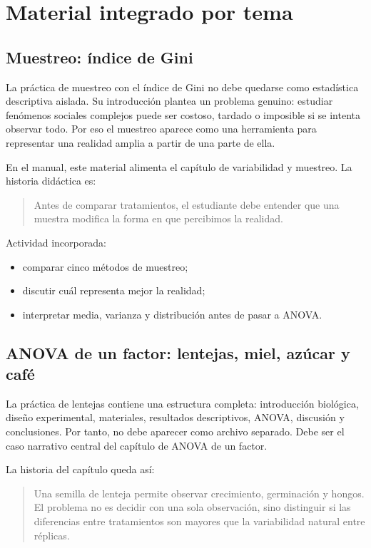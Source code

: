 \section{Material integrado por tema}

\subsection{Muestreo: índice de Gini}

La práctica de muestreo con el índice de Gini no debe quedarse como estadística descriptiva aislada. Su introducción plantea un problema genuino: estudiar fenómenos sociales complejos puede ser costoso, tardado o imposible si se intenta observar todo. Por eso el muestreo aparece como una herramienta para representar una realidad amplia a partir de una parte de ella.

En el manual, este material alimenta el capítulo de variabilidad y muestreo. La historia didáctica es:

\begin{quote}
Antes de comparar tratamientos, el estudiante debe entender que una muestra modifica la forma en que percibimos la realidad.
\end{quote}

Actividad incorporada:

\begin{itemize}
  \item comparar cinco métodos de muestreo;
  \item discutir cuál representa mejor la realidad;
  \item interpretar media, varianza y distribución antes de pasar a ANOVA.
\end{itemize}

\subsection{ANOVA de un factor: lentejas, miel, azúcar y café}

La práctica de lentejas contiene una estructura completa: introducción biológica, diseño experimental, materiales, resultados descriptivos, ANOVA, discusión y conclusiones. Por tanto, no debe aparecer como archivo separado. Debe ser el caso narrativo central del capítulo de ANOVA de un factor.

La historia del capítulo queda así:

\begin{quote}
Una semilla de lenteja permite observar crecimiento, germinación y hongos. El problema no es decidir con una sola observación, sino distinguir si las diferencias entre tratamientos son mayores que la variabilidad natural entre réplicas.
\end{quote}

